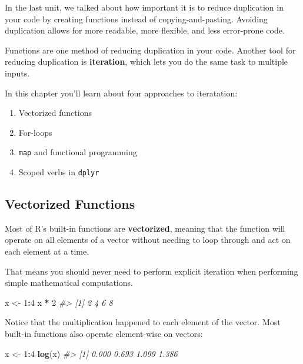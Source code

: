 \documentclass[]{book}
\newenvironment{Shaded}{\begin{snugshade}}{\end{snugshade}}
\newcommand{\CommentTok}[1]{\textcolor[rgb]{0.56,0.35,0.01}{\textit{#1}}}
\newcommand{\DecValTok}[1]{\textcolor[rgb]{0.00,0.00,0.81}{#1}}
\newcommand{\KeywordTok}[1]{\textcolor[rgb]{0.13,0.29,0.53}{\textbf{#1}}}
\newcommand{\NormalTok}[1]{#1}
\newcommand{\OperatorTok}[1]{\textcolor[rgb]{0.81,0.36,0.00}{\textbf{#1}}}
\newcommand{\StringTok}[1]{\textcolor[rgb]{0.31,0.60,0.02}{#1}}
\providecommand{\tightlist}{%
  \setlength{\itemsep}{0pt}\setlength{\parskip}{0pt}}
\begin{document}
In the last unit, we talked about how important it is to reduce duplication in your code by creating functions instead of copying-and-pasting. Avoiding duplication allows for more readable, more flexible, and less error-prone code.

Functions are one method of reducing duplication in your code. Another tool for reducing duplication is \textbf{iteration}, which lets you do the same task to multiple inputs.

In this chapter you'll learn about four approaches to iteratation:

\begin{enumerate}
\def\labelenumi{\arabic{enumi}.}
\tightlist
\item
  Vectorized functions
\item
  For-loops
\item
  \texttt{map} and functional programming
\item
  Scoped verbs in \texttt{dplyr}
\end{enumerate}

\hypertarget{vectorized-functions}{%
\subsection{Vectorized Functions}\label{vectorized-functions}}

Most of R's built-in functions are \textbf{vectorized}, meaning that the function will operate on all elements of a vector without needing to loop through and act on each element at a time.

That means you should never need to perform explicit iteration when performing simple mathematical computations.

\begin{Shaded}
\begin{Highlighting}[]
\NormalTok{x <-}\StringTok{ }\DecValTok{1}\OperatorTok{:}\DecValTok{4}
\NormalTok{x }\OperatorTok{*}\StringTok{ }\DecValTok{2}
\CommentTok{#> [1] 2 4 6 8}
\end{Highlighting}
\end{Shaded}

Notice that the multiplication happened to each element of the vector. Most built-in functions also operate element-wise on vectors:

\begin{Shaded}
\begin{Highlighting}[]
\NormalTok{x <-}\StringTok{ }\DecValTok{1}\OperatorTok{:}\DecValTok{4}
\KeywordTok{log}\NormalTok{(x)}
\CommentTok{#> [1] 0.000 0.693 1.099 1.386}
\end{Highlighting}
\end{Shaded}
\end{document}
